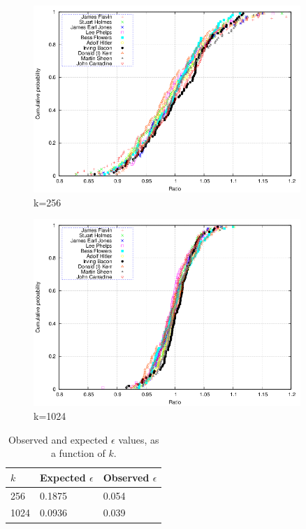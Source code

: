 \documentclass[a4paper,11pt]{article}
\begin{document}
\begin{figure}[H]
\centering \includegraphics[width=0.9\textwidth]{plot256.png}
\caption{k=256}\label{fig:k256}
\label{fig:exp256}
\end{figure}
\begin{figure}[H]
\centering \includegraphics[width=0.9\textwidth]{plot1024.png}
\caption{k=1024}\label{fig:k1024}
\label{fig:exp1024}
\end{figure}
\begin{table}[H]
    \begin{center}
    \begin{tabular}{l|l|l}
    $k$    & Expected $\epsilon$      & Observed $\epsilon$ \\ \hline
    256  & 0.1875 & 0.054      \\ \hline
    1024 & 0.0936 & 0.039      \\
    \end{tabular}
    \end{center}
\caption{Observed and expected $\epsilon$ values, as a function of $k$.}\label{tab:epsilon}
\end{table}
\end{document}
